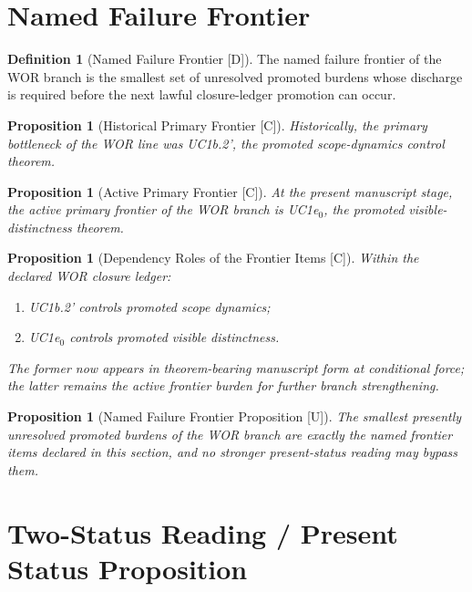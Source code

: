 \documentclass[11pt]{article}
\newtheorem{proposition}[theorem]{Proposition}
\theoremstyle{definition}
\newtheorem{definition}[theorem]{Definition}
\theoremstyle{remark}
\newcommand{\U}{\textnormal{[U]}}
\newcommand{\C}{\textnormal{[C]}}
\newcommand{\D}{\textnormal{[D]}}
\begin{document}
\section{Named Failure Frontier}

\begin{definition}[Named Failure Frontier {\D}]
The named failure frontier of the WOR branch is the smallest set of unresolved promoted burdens whose discharge is required before the next lawful closure-ledger promotion can occur.
\end{definition}

\begin{proposition}[Historical Primary Frontier {\C}]
Historically, the primary bottleneck of the WOR line was UC1b.2', the promoted scope-dynamics control theorem.
\end{proposition}

\begin{proposition}[Active Primary Frontier {\C}]
At the present manuscript stage, the active primary frontier of the WOR branch is UC1e$_0$, the promoted visible-distinctness theorem.
\end{proposition}

\begin{proposition}[Dependency Roles of the Frontier Items {\C}]
Within the declared WOR closure ledger:
\begin{enumerate}[label=(\arabic*)]
    \item UC1b.2' controls promoted scope dynamics;
    \item UC1e$_0$ controls promoted visible distinctness.
\end{enumerate}
The former now appears in theorem-bearing manuscript form at conditional force; the latter remains the active frontier burden for further branch strengthening.
\end{proposition}

\begin{proposition}[Named Failure Frontier Proposition {\U}]
The smallest presently unresolved promoted burdens of the WOR branch are exactly the named frontier items declared in this section, and no stronger present-status reading may bypass them.
\end{proposition}

\section{Two-Status Reading / Present Status Proposition}
\end{document}
